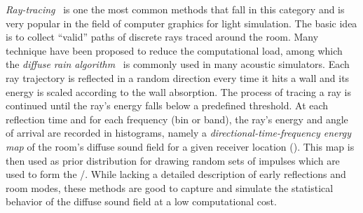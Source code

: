 
\mynewline
\textit{Ray-tracing}~ is one the most common methods that fall in this category and is very popular in the field of computer graphics for light simulation.
The basic idea is to collect ``valid'' paths of discrete rays traced around the room.
Many technique have been proposed to reduce the computational load, among which the \textit{diffuse rain algorithm}~ is commonly used in many acoustic simulators.
Each ray trajectory is reflected in a random direction every time it hits a wall and its energy is scaled according to the wall absorption.
The process of tracing a ray is continued until the ray’s energy falls below a predefined threshold.
At each reflection time and for each frequency (bin or band), the ray's energy and angle of arrival are recorded in histograms,
namely a \textit{directional-time-frequency energy map} of the room’s diffuse sound field for a given receiver location ().
This map is then used as prior distribution for drawing random sets of impulses which are used to form the \RIR/.
While lacking a detailed description of early reflections and room modes,
these methods are good to capture and simulate the statistical behavior of the diffuse sound field at a low computational cost.


